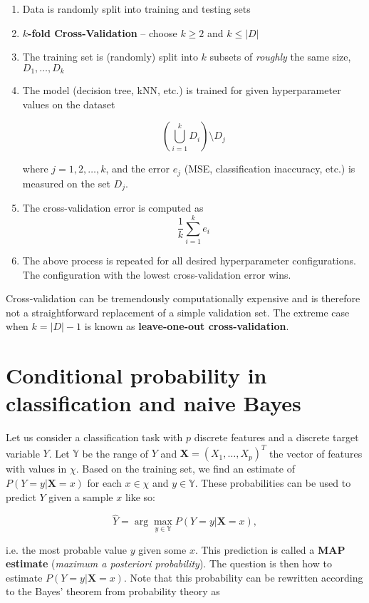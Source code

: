 \documentclass[a4paper]{article}
\begin{document}
	\begin{enumerate}
		\item Data is randomly split into training and testing sets
		\item \textbf{$k$-fold Cross-Validation} -- choose $k \ge 2$ and $k \le |D|$
		\item The training set is (randomly) split into $k$ subsets
			of \textit{roughly} the same size, $D_1, \ldots, D_k$
		\item The model (decision tree, kNN, etc.) is trained for
			given hyperparameter values on the dataset

			$$\left(\bigcup_{i = 1}^k D_i\right) \setminus D_j$$

			where $j = 1, 2, \ldots, k$, and the error $e_j$ (MSE, classification
			inaccuracy, etc.) is measured on the set $D_j$.
		\item The cross-validation error is computed as
			$$\frac{1}{k} \sum_{i = 1}^k e_i$$
		\item The above process is repeated for all desired hyperparameter
			configurations. The configuration with the lowest cross-validation
			error wins.
	\end{enumerate}

	Cross-validation can be tremendously computationally expensive and is therefore
	not a straightforward replacement of a simple validation set. The extreme
	case when $k = |D| - 1$ is known as \textbf{leave-one-out cross-validation}.

	\section{Conditional probability in classification and naive Bayes}
	Let us consider a classification task with $p$ discrete features and a discrete
	target variable $Y$. Let $\mathbb{Y}$ be the range of $Y$ and
	$\boldsymbol{X} = (X_1, \ldots, X_p)^T$ the vector of features with values in $\chi$.
	Based on the training set, we find an estimate of $P(Y = y | \boldsymbol{X} = x)$ for each
	$x \in \chi$ and $y \in \mathbb{Y}$. These probabilities can be used to predict
	$Y$ given a sample $x$ like so:

	\[
		\hat{Y} = \arg \max_{y \in \mathbb{Y}} P(Y = y | \boldsymbol{X} = x)
	,\]

	i.e. the most probable value $y$ given some $x$. This prediction is called a
	\textbf{MAP estimate} (\textit{maximum a posteriori probability}). The question
	is then how to estimate $P(Y = y | \boldsymbol{X} = x)$. Note that this probability
	can be rewritten according to the Bayes' theorem from probability theory as
\end{document}

